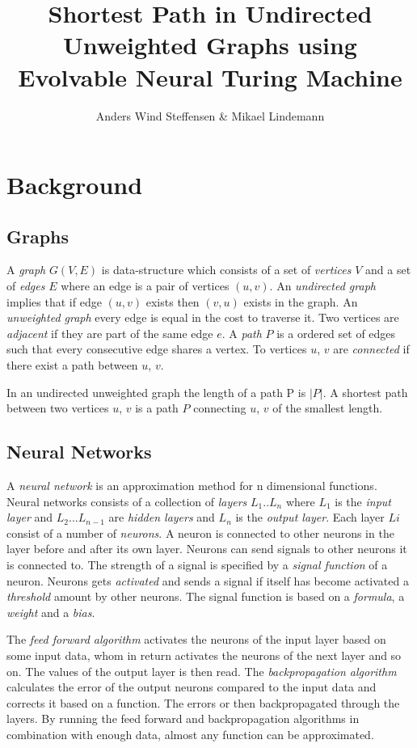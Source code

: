 \documentclass{article}
\author{Anders Wind Steffensen \& Mikael Lindemann}
\title{Shortest Path in Undirected Unweighted Graphs using Evolvable Neural Turing Machine}
\begin{document}
\maketitle
\tableofcontents
\newpage
\section{Background}
\subsection{Graphs}
A \textit{graph} $G(V,E)$ is data-structure which consists of a set of \textit{vertices} $V$ and a set of \textit{edges} $E$ where an edge is a pair of vertices $(u,v)$. An \textit{undirected graph} implies that if edge $ (u,v) $ exists then $ (v,u) $ exists in the graph. An \textit{unweighted graph} every edge is equal in the cost to traverse it. 
Two vertices are \textit{adjacent} if they are part of the same edge $ e $. A \textit{path} $ P $ is a ordered set of edges such that every consecutive edge shares a vertex. To vertices $ u $, $ v $ are \textit{connected} if there exist a path between $ u $, $ v $.

In an undirected unweighted graph the length of a path P is $ |P| $. A shortest path between two vertices  $ u $, $ v $ is a path $ P $ connecting  $ u $, $ v $ of the smallest length. 

\subsection{Neural Networks}
A \textit{neural network} is an approximation method for n dimensional functions. Neural networks consists of a collection of \textit{layers} $ L_1 .. L_n $ where $ L_1 $ is the \textit{input layer} and $ L_2 ... L_{n-1} $ are \textit{hidden layers} and $ L_n $ is the \textit{output layer}. Each layer $ Li $ consist of a number of \textit{neurons}. A neuron is connected to other neurons in the layer before and after its own layer. Neurons can send signals to other neurons it is connected to. The strength of a signal is specified by a \textit{signal function} of a neuron. Neurons gets \textit{activated} and sends a signal if itself has become activated a \textit{threshold} amount by other neurons. The signal function is based on a \textit{formula}, a \textit{weight} and a \textit{bias}. 

The \textit{feed forward algorithm} activates the neurons of the input layer based on some input data, whom in return activates the neurons of the next layer and so on. The values of the output layer is then read. The \textit{backpropagation algorithm} calculates the error of the output neurons compared to the input data and corrects it based on a function. The errors or then backpropagated through the layers. By running the feed forward and backpropagation algorithms in combination with enough data, almost any function can be approximated.
\end{document}
